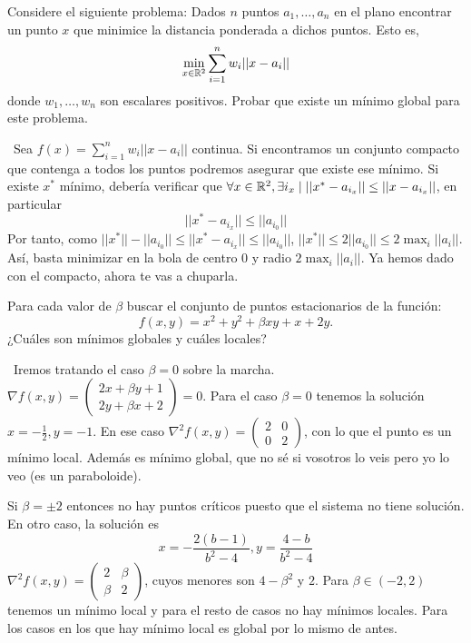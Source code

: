 \documentclass[twoside]{article}
\begin{document}
\newpage 

\begin{ejercicio}{4}
Considere el siguiente problema:
Dados $n$ puntos $a_1,\dots,a_n$ en el plano encontrar un punto $x$ que minimice la distancia ponderada a dichos puntos. Esto es,
$$\min_{x\in\mathbb{R}^2}\sum_{i=1}^nw_i||x-a_i||$$
donde $w_1,\dots,w_n$ son escalares positivos. Probar que existe un mínimo global para este problema. 
\begin{solucion}\
Sea $f(x)=\sum_{i=1}^nw_i||x-a_i||$ continua. Si encontramos un conjunto compacto que contenga a todos los puntos podremos asegurar que existe ese mínimo. Si existe $x^*$ mínimo, debería verificar que $\forall x\in\mathbb{R}^2, \exists i_x\mid ||x^*-a_{i_x}||\leq ||x-a_{i_x}||$, en particular $$||x^*-a_{i_x}||\leq ||a_{i_0}||$$
Por tanto, como $||x^*||-||a_{i_0}||\leq ||x^*-a_{i_x}||\leq ||a_{i_0}||$, $||x^*||\leq 2||a_{i_0}||\leq 2\max_i{||a_i||}$. Así, basta minimizar en la bola de centro 0 y radio $2\max_i{||a_i||}$. Ya hemos dado con el compacto, ahora te vas a chuparla.
\end{solucion}
\end{ejercicio}

\newpage 

\begin{ejercicio}{5}

Para cada valor de $\beta$ buscar el conjunto de puntos estacionarios de la función: $$f(x,y)=x^2+y^2+\beta xy+x+2y.$$
¿Cuáles son mínimos globales y cuáles locales?
\begin{solucion}\
Iremos tratando el caso $\beta=0$ sobre la marcha. $\nabla f(x,y)=\begin{pmatrix}
2x+\beta y +1\\
2y+\beta x+2
\end{pmatrix}=0$. Para el caso $\beta=0$ tenemos la solución $x=-\frac{1}{2},y=-1$. En ese caso $\nabla^2 f(x,y)=\begin{pmatrix}
2 & 0\\
0 & 2
\end{pmatrix}$, con lo que el punto es un mínimo local.  Además es mínimo global, que no sé si vosotros lo veis pero yo lo veo (es un paraboloide).

Si $\beta=\pm 2$ entonces no hay puntos críticos puesto que el sistema no tiene solución. En otro caso, la solución es 
$$x=-\frac{2(b-1)}{b^2-4}, y=\frac{4-b}{b^2-4}$$
$\nabla^2 f(x,y)=\begin{pmatrix}
2 & \beta\\
\beta & 2
\end{pmatrix}$, cuyos menores son $4-\beta^2$ y $2$. Para $\beta\in (-2,2)$ tenemos un mínimo local y para el resto de casos no hay mínimos locales. Para los casos en los que hay mínimo local es global por lo mismo de antes. 
\end{solucion}
\end{ejercicio}
\end{document}

